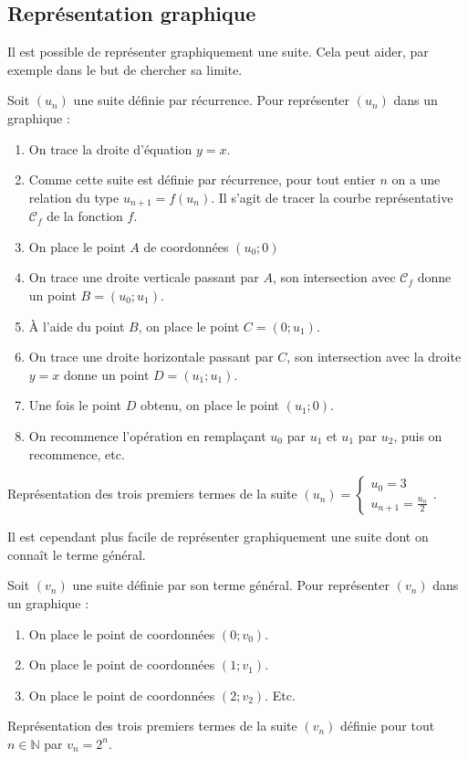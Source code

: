 	\subsection{Représentation graphique}
	
	Il est possible de représenter graphiquement une suite. Cela peut aider, par exemple dans le but de chercher sa limite.
	
	\begin{formula}
		Soit $(u_n)$ une suite définie par récurrence. Pour représenter $(u_n)$ dans un graphique :
		\begin{enumerate}
			\item On trace la droite d'équation $y = x$.
			\item  Comme cette suite est définie par récurrence, pour tout entier $n$ on a une relation du type $u_{n+1} = f(u_n)$. Il s'agit de tracer la courbe représentative $\mathcal{C}_f$ de la fonction $f$.
			\item On place le point $A$ de coordonnées $(u_0; 0)$
			\item On trace une droite verticale passant par $A$, son intersection avec $\mathcal{C}_f$ donne un point $B = (u_0; u_1)$.
			\item À l'aide du point $B$, on place le point $C = (0; u_1)$.
			\item On trace une droite horizontale passant par $C$, son intersection avec la droite $y = x$ donne un point $D = (u_1; u_1)$.
			\item Une fois le point $D$ obtenu, on place le point $(u_1; 0)$.
			\item On recommence l'opération en remplaçant $u_0$ par $u_1$ et $u_1$ par $u_2$, puis on recommence, etc.
		\end{enumerate}
	\end{formula}
	
	\begin{tip}[Exemple]
		Représentation des trois premiers termes de la suite $(u_n) = \begin{cases} u_0 = 3 \\ u_{n+1} = \frac{u_n}{2} \end{cases}$.
	\end{tip}
	
	Il est cependant plus facile de représenter graphiquement une suite dont on connaît le terme général.
	
	\begin{formula}
		Soit $(v_n)$ une suite définie par son terme général. Pour représenter $(v_n)$ dans un graphique :
		\begin{enumerate}
			\item On place le point de coordonnées $(0; v_0)$.
			\item On place le point de coordonnées $(1; v_1)$.
			\item On place le point de coordonnées $(2; v_2)$. Etc.
		\end{enumerate}
	\end{formula}
	
	\begin{tip}[Exemple]
		Représentation des trois premiers termes de la suite $(v_n)$ définie pour tout $n \in \mathbb{N}$ par $v_n = 2^n$.
	\end{tip}
